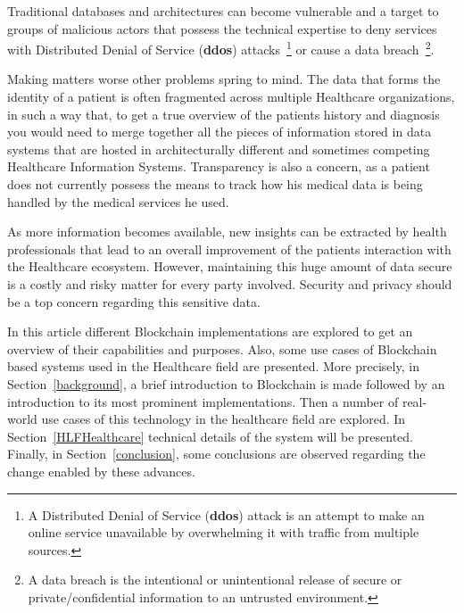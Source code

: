 Traditional databases and architectures can become vulnerable and a target to
groups of malicious actors that possess the technical expertise to deny
services with Distributed Denial of Service (\textbf{ddos}) attacks~\footnote{A
Distributed Denial of Service (\textbf{ddos}) attack is an attempt to make an
online service unavailable by overwhelming it with traffic from multiple
sources.} or cause a data breach~\footnote{A data breach is the intentional or
unintentional release of secure or private/confidential information to an
untrusted environment.}. 

Making matters worse other problems spring to mind. The data that forms the
identity of a patient is often fragmented across multiple Healthcare
organizations, in such a way that, to get a true overview of the patients
history and diagnosis you would need to merge together all the pieces of
information stored in data systems that are hosted in architecturally different
and sometimes competing Healthcare Information Systems. Transparency is also a
concern, as a patient does not currently possess the means to track how his
medical data is being handled by the medical services he used.

As more information becomes available, new insights can be extracted by health
professionals that lead to an overall improvement of the patients interaction
with the Healthcare ecosystem. However, maintaining this huge amount of data
secure is a costly and risky matter for every party involved. Security and
privacy should be a top concern regarding this sensitive data. 

In this article different Blockchain implementations are explored to get an
overview of their capabilities and purposes. Also, some use cases of Blockchain
based systems used in the Healthcare field are presented. More precisely, in
Section~\ref{background}, a brief introduction to Blockchain is made followed
by an introduction to its most prominent implementations. Then a number of
real-world use cases of this technology in the healthcare field are explored.
In Section~\ref{HLFHealthcare} technical details of the system will be
presented. Finally, in Section~\ref{conclusion}, some conclusions are observed
regarding the change enabled by these advances.
